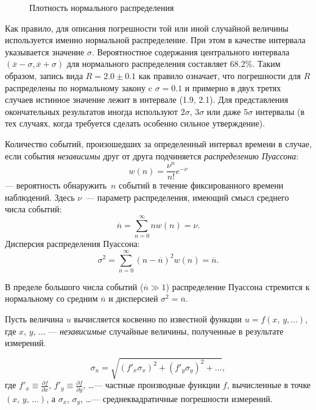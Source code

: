 \begin{booksupplement}
\begin{figure}\centering
    \caption{Плотность нормального распределения}
\end{figure}

Как правило, для описания погрешности той или иной случайной величины используется именно нормальной распределение. 
При этом в качестве интервала указывается значение $\sigma$. Вероятностное содержания центрального интервала $(\overline{x} -\sigma, \overline{x} + \sigma)$
для нормального распределения составляет 68.2\%. Таким образом, запись вида $R = 2.0 \pm 0.1$ как правило означает, что погрешности для $R$ распределены по
нормальному закону c $\sigma = 0.1$ и примерно в двух третях случаев истинное значение лежит в интервале (1.9, 2.1). Для представления окончательных результатов
иногда используют $2\sigma$, $3\sigma$ или даже $5\sigma$ интервалы (в тех случаях, когда требуется сделать особенно сильное утверждение).

Количество событий, произошедших за определенный интервал времени в случае, если события \emph{независимы} друг от друга
подчиняется \emph{распределению Пуассона}:
\[
w(n) = \frac{\nu^n}{n!}e^{-\nu}
\]
--- вероятность обнаружить~$n$ событий в течение фиксированного времени наблюдений. Здесь $\nu$~--- параметр распределения,
имеющий смысл среднего числа событий:
\[
\overline{n} = \sum\limits_{n=0}^{\infty} n w(n) = \nu.
\]
Дисперсия распределения Пуассона:
\[
\sigma^2 = \sum\limits_{n=0}^{\infty} (n-\overline{n})^2 w(n) = \overline{n}.
\]

В пределе большого числа событий ($\overline{n} \gg 1$) распределение Пуассона
стремится к нормальному со средним $\overline{n}$ и 
дисперсией $\sigma^2 = \overline{n}$.

Пусть величина $u$ вычисляется косвенно по известной функции $u=f(x,\,y,\ldots)$, 
где ${x,\,y,\,\ldots}$ --- \emph{независимые} случайные величины,
полученные в результате измерений. 

\begin{description}[font=\mdseries\sffamily]
\item[Общая формула вычисления погрешности:]
\[
\sigma_u = \sqrt{ (f'_x \sigma_x)^2 + (f'_y \sigma_y)^2 + \ldots},
\]
где $f'_x \equiv \frac{\partial f}{\partial x}$, 
$f'_y \equiv \frac{\partial f}{\partial y}$, \ldots --- частные производные функции
$f$, вычисленные в точке $(x,\,y,\,\ldots)$, а
$\sigma_x$, $\sigma_y$, \ldots --- среднеквадратичные погрешности измерений.


\end{description}
\end{booksupplement}

